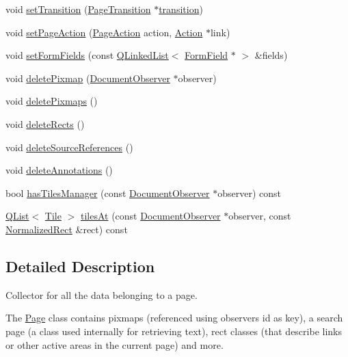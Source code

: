 \begin{DoxyCompactItemize}
\item 
void \hyperlink{classOkular_1_1Page_a358f19e68e3722c868ee23da44c4f51e}{set\+Transition} (\hyperlink{classOkular_1_1PageTransition}{Page\+Transition} $\ast$\hyperlink{classOkular_1_1Page_a9ca239aa5e2957a354075636086723cb}{transition})
\item 
void \hyperlink{classOkular_1_1Page_add2a5b0b8218d36229a208f85b9904db}{set\+Page\+Action} (\hyperlink{classOkular_1_1Page_a6a8e241cdb604d5c90d5f80b169788f7}{Page\+Action} action, \hyperlink{classOkular_1_1Action}{Action} $\ast$link)
\item 
void \hyperlink{classOkular_1_1Page_a54e2ca469ed94addbdda847f785cbf70}{set\+Form\+Fields} (const \hyperlink{classQLinkedList}{Q\+Linked\+List}$<$ \hyperlink{classOkular_1_1FormField}{Form\+Field} $\ast$ $>$ \&fields)
\item 
void \hyperlink{classOkular_1_1Page_a173c54714b3edd09a96175fabd8f756d}{delete\+Pixmap} (\hyperlink{classOkular_1_1DocumentObserver}{Document\+Observer} $\ast$observer)
\item 
void \hyperlink{classOkular_1_1Page_a67ec01b2993c3e9e168d49d7829a3d4d}{delete\+Pixmaps} ()
\item 
void \hyperlink{classOkular_1_1Page_acb8ef8026db456d308c2658bc479cc4b}{delete\+Rects} ()
\item 
void \hyperlink{classOkular_1_1Page_a3684cdc3ad5a51078e8e48cf56594c6d}{delete\+Source\+References} ()
\item 
void \hyperlink{classOkular_1_1Page_a63511ffbc3aa919ccdf8ac628ae538f2}{delete\+Annotations} ()
\item 
bool \hyperlink{classOkular_1_1Page_adc0913df4b9c04bae5612e9861673bb5}{has\+Tiles\+Manager} (const \hyperlink{classOkular_1_1DocumentObserver}{Document\+Observer} $\ast$observer) const 
\item 
\hyperlink{classQList}{Q\+List}$<$ \hyperlink{classOkular_1_1Tile}{Tile} $>$ \hyperlink{classOkular_1_1Page_a5dea3e142724e8c320b50bba420bd03b}{tiles\+At} (const \hyperlink{classOkular_1_1DocumentObserver}{Document\+Observer} $\ast$observer, const \hyperlink{classOkular_1_1NormalizedRect}{Normalized\+Rect} \&rect) const 
\end{DoxyCompactItemize}


\subsection{Detailed Description}
Collector for all the data belonging to a page. 

The \hyperlink{classOkular_1_1Page}{Page} class contains pixmaps (referenced using observers id as key), a search page (a class used internally for retrieving text), rect classes (that describe links or other active areas in the current page) and more.

